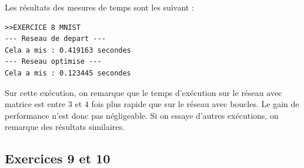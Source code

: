\documentclass[a4paper,11pt]{article}
\begin{document}
Les résultats des mesures de temps sont les suivant : 

\begin{verbatim}
>>EXERCICE 8 MNIST
--- Reseau de depart ---
Cela a mis : 0.419163 secondes
--- Reseau optimise ---
Cela a mis : 0.123445 secondes
\end{verbatim}

Sur cette exécution, on remarque que le temps d'exécution sur le réseau avec matrice est entre 3 et 4 fois plus rapide que sur le réseau avec boucles. Le gain de performance n'est donc pas négligeable.
Si on essaye d'autres exécutions, on remarque des résultats similaires.

\subsection{Exercices 9 et 10}
\end{document}
